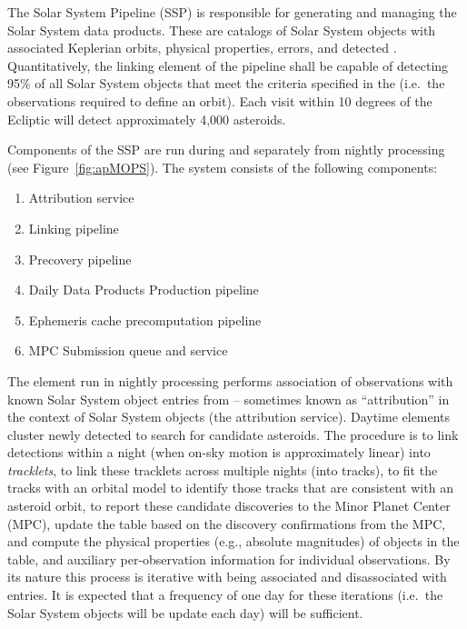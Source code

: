 The Solar System Pipeline (SSP) is responsible for generating and managing the Solar System data products. These are catalogs of Solar System objects with associated Keplerian orbits, physical properties, errors, and detected \DIASources. Quantitatively, the linking element of the pipeline shall be capable of detecting 95\%  of all Solar System objects that meet the criteria specified in the \OSS\@ {} (i.e.\ the observations required to define an orbit). Each visit within 10 degrees of the Ecliptic will detect approximately 4,000 asteroids.

Components of the SSP are run during and separately from nightly processing (see Figure~\ref{fig:apMOPS}). The system consists of the following components:
%
\begin{enumerate}
	\item Attribution service
	\item Linking pipeline
	\item Precovery pipeline
	\item Daily Data Products Production pipeline
	\item Ephemeris cache precomputation pipeline
	\item MPC Submission queue and service
\end{enumerate}
%
The element run in nightly processing performs association of observations with known Solar System object entries from \MPCORB -- sometimes known as ``attribution'' in the context of Solar System objects (the attribution service). Daytime elements cluster newly detected \DIAObjects to search for candidate asteroids. The procedure is to link \DIASource detections within a night (when on-sky motion is approximately linear) into {\em tracklets}, to link these tracklets across multiple nights (into tracks), to fit the tracks with an orbital model to identify those tracks that are consistent with an asteroid orbit, to report these candidate discoveries to the Minor Planet Center (MPC), update the \MPCORB table based on the discovery confirmations from the MPC, and compute the physical properties (e.g., absolute magnitudes) of objects in the \SSObject table, and auxiliary per-observation information for individual observations. By its nature this process is iterative with \DIASources being associated and disassociated with \MPCORB entries. It is expected that a frequency of one day for these iterations (i.e.\ the Solar System objects will be update each day) will be sufficient.

